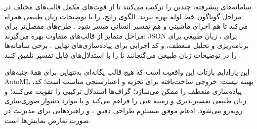 سامانه‌های پیشرفته، چندین  را ترکیب می‌کنند تا از قوت‌های مکمل قالب‌های مختلف در مراحل گوناگون خط لوله بهره ببرند. الگوی رایج،  را با توضیحات زبان طبیعی همراه می‌کند تا هم اجرای ماشینی و هم تفسیر انسانی میسر شود \cite{liu2025agenthpo, zhang2023usingLLMforHPO}. طرح‌های مفصل‌تر برای مراحل متمایز از قالب‌های متفاوت بهره می‌گیرند: JSON برای ، زبان طبیعی برای برنامه‌ریزی و تحلیل منعطف، و کد اجرایی برای پیاده‌سازی‌های نهایی \cite{trirat2025automlagent, zhang2023AutomlGPTAutomaticMachineLearning}. برخی سامانه‌ها  را در توضیحات زبان طبیعی می‌گنجانند تا  را با استدلال‌های قابل تفسیر تلفیق کنند \cite{ji2025RZNAS, Yang2025NADER}.

این پارادایم بازتاب این واقعیت است که هیچ قالب یگانه‌ای به‌تنهایی برای همهٔ جنبه‌های AutoML بهینه نیست: خروجی ساخت‌یافته برای تجزیه و اعتبارسنجی مناسب است؛ کد، پیاده‌سازی منعطف را ممکن می‌سازد؛ گراف‌ها استدلال ترکیبی را تقویت می‌کنند؛ و زبان طبیعی تفسیرپذیری و زمینهٔ غنی را فراهم می‌کند و با موارد دشوار صوری‌سازی روبه‌رو می‌شود. ادغام موفق مستلزم طراحی دقیق ،  و راهبردهایی برای مدیریت  در صورت تعارض نمایش‌ها است.